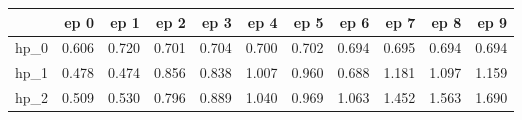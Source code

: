 \begin{tabular}{lrrrrrrrrrr}
\toprule
{} &   ep 0 &   ep 1 &   ep 2 &   ep 3 &   ep 4 &   ep 5 &   ep 6 &   ep 7 &   ep 8 &   ep 9 \\
\midrule
hp\_0 &  0.606 &  0.720 &  0.701 &  0.704 &  0.700 &  0.702 &  0.694 &  0.695 &  0.694 &  0.694 \\
hp\_1 &  0.478 &  0.474 &  0.856 &  0.838 &  1.007 &  0.960 &  0.688 &  1.181 &  1.097 &  1.159 \\
hp\_2 &  0.509 &  0.530 &  0.796 &  0.889 &  1.040 &  0.969 &  1.063 &  1.452 &  1.563 &  1.690 \\
\bottomrule
\end{tabular}
